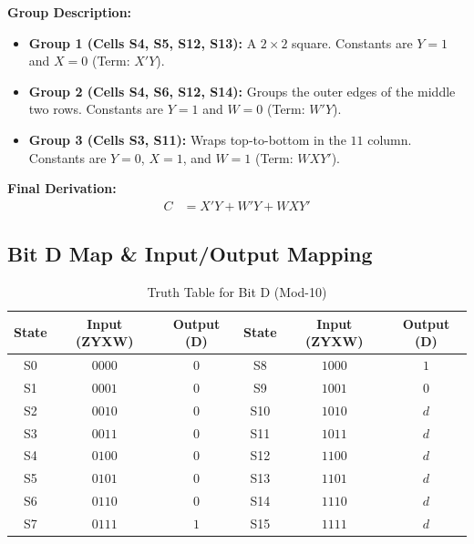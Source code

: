 \documentclass[journal,12pt,onecolumn]{IEEEtran}
\begin{document}
		\begin{justify}
			\textbf{Group Description:}
			\begin{itemize}
				\item \textbf{Group 1 (Cells S4, S5, S12, S13):} A $2 \times 2$ square. Constants are $Y=1$ and $X=0$ (Term: $X'Y$).
				\item \textbf{Group 2 (Cells S4, S6, S12, S14):} Groups the outer edges of the middle two rows. Constants are $Y=1$ and $W=0$ (Term: $W'Y$).
				\item \textbf{Group 3 (Cells S3, S11):} Wraps top-to-bottom in the $11$ column. Constants are $Y=0$, $X=1$, and $W=1$ (Term: $WXY'$).
			\end{itemize}
			
			\textbf{Final Derivation:}
			\begin{align}
				C &= X'Y + W'Y + WXY'
			\end{align}
		\end{justify}
		
		\vspace{1em}
		\subsection{Bit D Map \& Input/Output Mapping}
		
		\begin{table}[H]
			\centering
			\begin{tabular}{|c|c|c||c|c|c|}
				\hline
				\textbf{State} & \textbf{Input (ZYXW)} & \textbf{Output (D)} & \textbf{State} & \textbf{Input (ZYXW)} & \textbf{Output (D)} \\
				\hline
				S0 & $0000$ & $0$ & S8 & $1000$ & $1$ \\
				\hline
				S1 & $0001$ & $0$ & S9 & $1001$ & $0$ \\
				\hline
				S2 & $0010$ & $0$ & S10 & $1010$ & $d$ \\
				\hline
				S3 & $0011$ & $0$ & S11 & $1011$ & $d$ \\
				\hline
				S4 & $0100$ & $0$ & S12 & $1100$ & $d$ \\
				\hline
				S5 & $0101$ & $0$ & S13 & $1101$ & $d$ \\
				\hline
				S6 & $0110$ & $0$ & S14 & $1110$ & $d$ \\
				\hline
				S7 & $0111$ & $1$ & S15 & $1111$ & $d$ \\
				\hline
			\end{tabular}
			\caption{Truth Table for Bit D (Mod-10)}
		\end{table}
		
\end{document}

